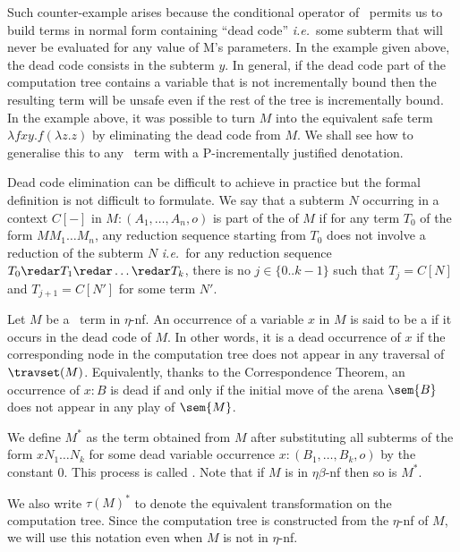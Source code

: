 Such counter-example arises because the conditional operator of \pcf\ permits us to build terms in normal form containing ``dead code'' {\it i.e.}~some subterm that will never be evaluated for any value of M's parameters. In the example given above, the dead code consists in the subterm $y$. In general, if the dead code part of the computation tree contains a variable that is not incrementally bound then the resulting term will be unsafe even if the rest of the tree is incrementally bound.
In the example above, it was possible to turn $M$ into the equivalent safe term $\lambda f x y. f (\lambda z. z)$ by eliminating the dead code from $M$.
We shall see how to generalise this to any \pcf\ term with a P-incrementally justified denotation.

Dead code elimination can be difficult to achieve in practice but the formal definition is not difficult to formulate. We say that a subterm $N$ occurring
in a context $C[-]$ in $M : (A_1, \ldots, A_n,o)$ is part of the  of $M$ if for any term $T_0$ of the form $M M_1 \ldots M_n$,
any reduction sequence starting from $T_0$ does not involve a reduction of the subterm $N$ {\it i.e.}~for any reduction sequence $T_0 \redar T_1 \redar \ldots \redar T_k$, there is no $j\in \{0.. k-1\}$ such that $T_j = C[N]$ and $T_{j+1} = C[N']$ for some term $N'$.
 

Let $M$  be a \pcf\ term in $\eta$-nf.
An occurrence of a variable $x$ in $M$ is said to be a 
if it occurs in the dead code of $M$. In other words, it is a
dead occurrence of $x$ if the corresponding node in the computation tree does not appear in any traversal of $\travset(M)$. Equivalently, thanks to the Correspondence Theorem, an occurrence of $x:B$ is dead if and only if the initial move
of the arena $\sem{B}$ does not appear in any play of $\sem{M}$.


We define $M^*$ as the term obtained from $M$ after substituting all subterms of the form  $x N_1 \dots N_k$ for some dead variable occurrence $x:(B_1,\ldots, B_k, o)$ by the constant $0$. This process is called .
Note that if $M$ is in $\eta\beta$-nf then so is $M^*$.

We also write $\tau(M)^*$ to denote the equivalent transformation on the computation tree. Since the computation tree is constructed from the $\eta$-nf of $M$, we will use this notation even when $M$ is not in $\eta$-nf.



